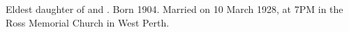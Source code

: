 
Eldest daughter of  and .\cite{WestAust1928}
Born 1904.\cite{BMD_WA_birth_1904_Perth}
Married  on 10 March 1928,\cite{WestAust1928}
at 7PM in the Ross Memorial Church in West Perth.
